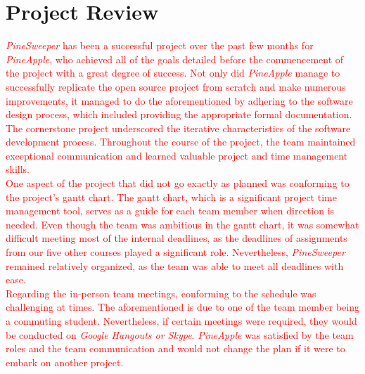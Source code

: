 \documentclass{article}
\begin{document}
\section{Project Review}
\textcolor{red}{\textit{PineSweeper} has been a successful project over the past few months for \textit{PineApple}, who achieved 
all of the goals detailed before the commencement of the project with a great degree of success. Not only did \textit{PineApple} manage
to successfully replicate the open source project from scratch and make numerous improvements, it managed to do the aforementioned
by adhering to the software design process, which included providing the appropriate formal documentation. The cornerstone project
underscored the iterative characteristics of the software development process. Throughout the course of the project, the team maintained
exceptional communication and learned valuable project and time management skills.}\\

\textcolor{red}{One aspect of the project that did not go exactly as planned was conforming to the project's gantt chart. The gantt chart,
which is a significant project time management tool, serves as a guide for each team member when direction is needed. Even though the
team was ambitious in the gantt chart, it was somewhat difficult meeting most of the internal deadlines, as the deadlines of assignments
from our five other courses played a significant role. Nevertheless, \textit{PineSweeper} remained relatively organized, as the team was
able to meet all deadlines with ease.}\\

\newpage
\textcolor{red}{Regarding the in-person team meetings, conforming to the schedule was challenging at times. The aforementioned is
due to one of the team member being a commuting student. Nevertheless, if certain meetings were required, they would be conducted
on \textit{Google Hangouts or Skype}. \textit{PineApple} was satisfied by the team roles and the team communication and would not
change the plan if it were to embark on another project.}
\end{document}
